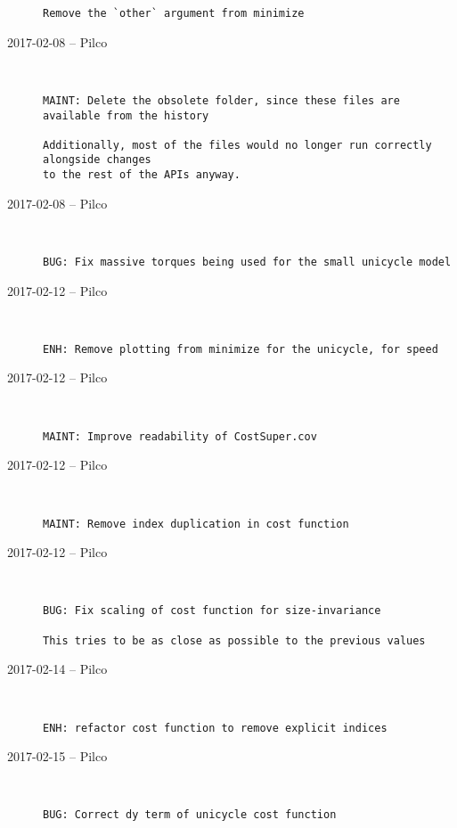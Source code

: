 \begin{description}
\begin{lstlisting}
Remove the `other` argument from minimize\end{lstlisting}


  \item[2017-02-08 -- Pilco] \hfill \
\begin{lstlisting}
MAINT: Delete the obsolete folder, since these files are available from the history

Additionally, most of the files would no longer run correctly alongside changes
to the rest of the APIs anyway.
\end{lstlisting}


  \item[2017-02-08 -- Pilco] \hfill \
\begin{lstlisting}
BUG: Fix massive torques being used for the small unicycle model
\end{lstlisting}


  \item[2017-02-12 -- Pilco] \hfill \
\begin{lstlisting}
ENH: Remove plotting from minimize for the unicycle, for speed
\end{lstlisting}


  \item[2017-02-12 -- Pilco] \hfill \
\begin{lstlisting}
MAINT: Improve readability of CostSuper.cov
\end{lstlisting}


  \item[2017-02-12 -- Pilco] \hfill \
\begin{lstlisting}
MAINT: Remove index duplication in cost function
\end{lstlisting}


  \item[2017-02-12 -- Pilco] \hfill \
\begin{lstlisting}
BUG: Fix scaling of cost function for size-invariance

This tries to be as close as possible to the previous values
\end{lstlisting}


  \item[2017-02-14 -- Pilco] \hfill \
\begin{lstlisting}
ENH: refactor cost function to remove explicit indices
\end{lstlisting}


  \item[2017-02-15 -- Pilco] \hfill \
\begin{lstlisting}
BUG: Correct dy term of unicycle cost function


\end{lstlisting}
\end{description}
